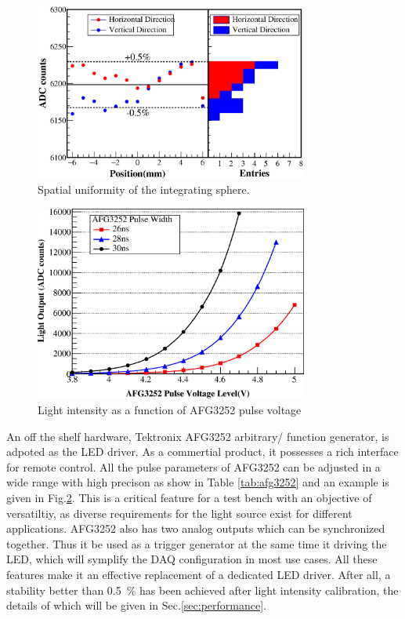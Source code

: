 \documentclass[5p, times]{elsarticle}
\begin{document}
\begin{figure}[h!]
 \centering
 \includegraphics[width=90mm]{uniformity_integratingsphere}
\caption{Spatial uniformity of the integrating sphere.}
\label{fig:uniformity_integratingsphere}
\end{figure} 
  
\begin{figure}[h!]
 \centering
 \includegraphics[width=90mm]{intesityVSvoltage}
\caption{Light intensity as a function of AFG3252 pulse voltage}
\label{fig:afg3252_intensityVSvoltage}
\end{figure} 

An off the shelf hardware, Tektronix AFG3252 arbitrary/ function generator, is adpoted as the LED driver.
As a commertial product, it possesses a rich interface for remote control.
All the pulse parameters of AFG3252 can be adjusted in a wide range with high precison as show in Table \ref{tab:afg3252} and an example is given in Fig.\ref{fig:afg3252_intensityVSvoltage}.
This is a critical feature for a test bench with an objective of versatiltiy, as diverse requirements for the light source exist for different applications.
AFG3252 also has two analog outputs which can be synchronized together.
Thus it be used as a trigger generator at the same time it driving the LED, which will symplify the DAQ configuration in most use cases. 
All these features make it an effective replacement of a dedicated LED driver. 
After all, a stability better than \SI{0.5}{\percent} has been achieved after light intensity calibration, the details of which will be given in Sec.\ref{sec:performance}.
\end{document}
